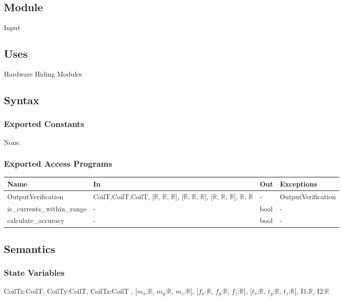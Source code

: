 \documentclass[12pt, titlepage]{article}
\begin{document}
\subsection{Module}
Input

\subsection{Uses}
Hardware Hiding Modules

\subsection{Syntax}

\subsubsection{Exported Constants}
None.
\subsubsection{Exported Access Programs}

\begin{center}
\begin{tabular}{p{4cm} p{3cm} p{4cm} p{2cm}}
\hline
\textbf{Name} & \textbf{In} & \textbf{Out} & \textbf{Exceptions} \\
\hline
OutputVerification & CoilT,CoilT,CoilT, [$\mathbb{R}$, $\mathbb{R}$, $\mathbb{R}$], [$\mathbb{R}$, $\mathbb{R}$, $\mathbb{R}$], [$\mathbb{R}$, $\mathbb{R}$, $\mathbb{R}$], $\mathbb{R}$, $\mathbb{R}$ & - & OutputVerification  \\
\hline
is\_currents\_within\_range & - & bool & -  \\
\hline

calculate\_accuracy & - & bool & -  \\
\hline
\end{tabular}
\end{center}

\subsection{Semantics}

\subsubsection{State Variables}
CoilTx:CoilT,  CoilTy:CoilT,  CoilTz:CoilT , [$m_x$:$\mathbb{R}$, $m_y$:$\mathbb{R}$, $m_z$:$\mathbb{R}$], [$f_x$:$\mathbb{R}$, $f_y$:$\mathbb{R}$, $f_z$:$\mathbb{R}$], [$t_x$:$\mathbb{R}$, $t_y$:$\mathbb{R}$, $t_z$:$\mathbb{R}$], I1:$\mathbb{R}$, I2:$\mathbb{R}$
\end{document}
